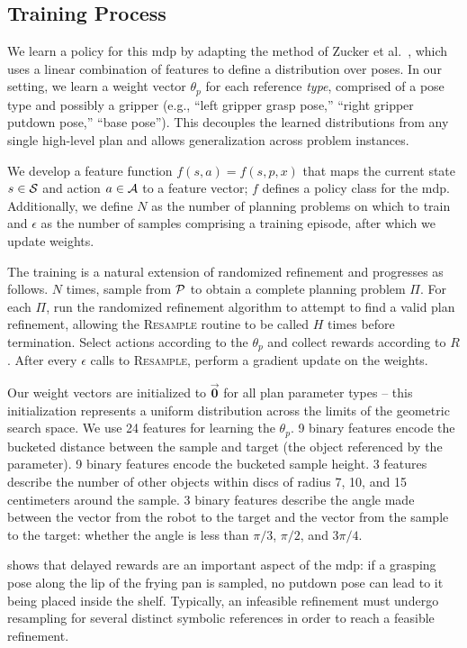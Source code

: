\subsection{Training Process}
We learn a policy for this {\sc mdp} by adapting the method of Zucker et al.~\cite{workspacebias}, which
uses a linear combination of features to define a distribution over poses. In our setting, we learn a weight
vector $\theta_{p}$ for each reference \emph{type}, comprised of a pose type and possibly a gripper
(e.g., ``left gripper grasp pose,'' ``right gripper putdown pose,'' ``base pose'').
This decouples the learned distributions from any single high-level plan and allows generalization across problem instances.

We develop a feature function $f(s, a) = f(s, p, x)$ that maps the current
state $s \in \mathcal{S}$ and action $a \in \mathcal{A}$ to a
feature vector; $f$ defines a policy class for the {\sc mdp}. Additionally, we define
$N$ as the number of planning problems on which to train and
$\epsilon$ as the number of samples comprising a training episode, after which we update weights.

The training is a natural extension of randomized
refinement and progresses as follows. $N$ times, sample from $\mathcal{P}$ to obtain
a complete planning problem $\Pi$. For each $\Pi$, run the randomized refinement
algorithm to attempt to find a valid plan refinement, allowing the \textsc{Resample}
routine to be called $H$ times before termination. Select actions according to the $\theta_{p}$
and collect rewards according to $R$. After every $\epsilon$ calls to
\textsc{Resample}, perform a gradient update on the weights.

Our weight vectors are initialized to $\vec{\mathbf{0}}$ for all plan parameter types -- this
initialization represents a uniform distribution across the limits of the geometric search space.
We use 24 features for learning the $\theta_{p}$. 9 binary features encode the bucketed distance between the sample
and target (the object referenced by the parameter). 9 binary features encode the bucketed sample height. 3 features
describe the number of other objects within discs of radius 7, 10, and 15 centimeters around the
sample. 3 binary features describe the angle made between the vector from the
robot to the target and the vector from the sample to the target: whether the angle is less than
$\pi/3$, $\pi/2$, and $3\pi/4$.

 shows that delayed rewards are an important
aspect of the {\sc mdp}: if a grasping pose along the lip of the frying pan is sampled, no putdown pose can lead
to it being placed inside the shelf. Typically, an infeasible refinement must undergo
resampling for several distinct symbolic references in order to reach a feasible refinement.

